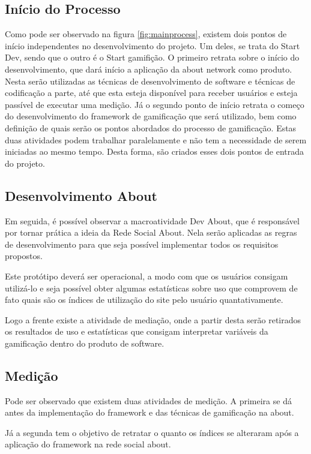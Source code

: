 \subsection{Início do Processo}
\label{sub:initialprocess}
Como pode ser observado na figura \ref{fig:mainprocess}, existem dois pontos
de início independentes no desenvolvimento do projeto. Um deles, se trata do
Start Dev, sendo que o outro é o Start gamifição. O primeiro retrata sobre
o início do desenvolvimento, que dará início a aplicação da about network
como produto. Nesta serão utilizadas as técnicas de desenvolvimento de software
e técnicas de codificação a parte, até que esta esteja disponível para receber
usuários e esteja passível de executar uma medição. Já o segundo ponto de início
retrata o começo do desenvolvimento do framework de gamificação que será utilizado,
bem como definição de quais serão os pontos abordados do processo de gamificação.
Estas duas atividades podem trabalhar paralelamente e não tem a necessidade de
serem iniciadas ao mesmo tempo. Desta forma, são criados esses dois pontos de
entrada do projeto.

\subsection{Desenvolvimento About}
\label{sub:Desenvolvimentoabout}
Em seguida, é possível observar a macroatividade Dev About, que é responsável
por tornar prática a ideia da Rede Social About. Nela serão aplicadas as
regras de desenvolvimento para que seja possível implementar todos os
requisitos propostos.

Este protótipo deverá ser operacional, a modo com que os usuários consigam
utilizá-lo e seja possível obter algumas estatísticas sobre uso que comprovem
de fato quais são os índices de utilização do site pelo usuário quantativamente.

Logo a frente existe a atividade de mediação, onde a partir desta serão retirados
os resultados de uso e estatísticas que consigam interpretar variáveis da gamificação
dentro do produto de software. 

\subsection{Medição}
\label{sub:medicao}
Pode ser observado que existem duas atividades de medição. A primeira se dá
antes da implementação do framework  e das técnicas de gamificação na about.

Já a segunda tem o objetivo de retratar o quanto os índices se alteraram após
a aplicação do framework na rede social about.

